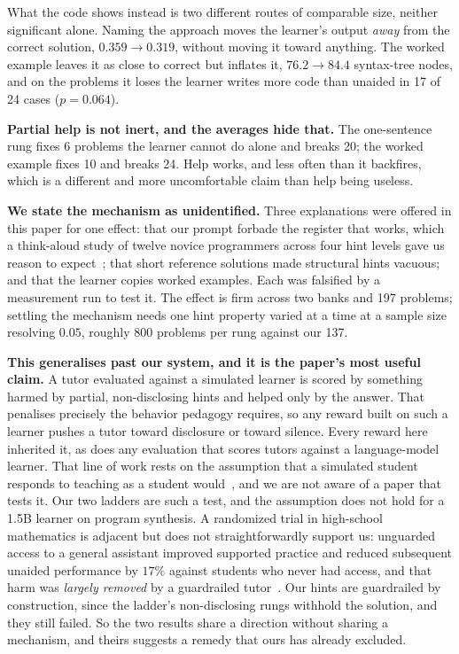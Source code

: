 \documentclass[conference]{IEEEtran}
\begin{document}
What the code shows instead is two different routes of comparable size, neither
significant alone. Naming the approach moves the learner's output \emph{away}
from the correct solution, $0.359 \rightarrow 0.319$, without moving it toward
anything. The worked example leaves it as close to correct but inflates it,
$76.2 \rightarrow 84.4$ syntax-tree nodes, and on the problems it loses the
learner writes more code than unaided in 17 of 24 cases ($p{=}0.064$).

\textbf{Partial help is not inert, and the averages hide that.} The
one-sentence rung fixes 6 problems the learner cannot do alone and breaks 20;
the worked example fixes 10 and breaks 24. Help works, and less often than it
backfires, which is a different and more uncomfortable claim than help being
useless.

\textbf{We state the mechanism as unidentified.} Three explanations were
offered in this paper for one effect: that our prompt forbade the register that
works, which a think-aloud study of twelve novice programmers across four hint
levels gave us reason to expect~\cite{hintlevels}; that short reference
solutions made structural hints vacuous; and that the learner copies worked
examples. Each was falsified by a measurement run to
test it. The effect is firm across two banks and 197 problems; settling the
mechanism needs one hint property varied at a time at a sample size resolving
$0.05$, roughly 800 problems per rung against our 137.

\textbf{This generalises past our system, and it is the paper's most useful
claim.} A tutor evaluated against a simulated learner is scored by something
harmed by partial, non-disclosing hints and helped only by the answer. That
penalises precisely the behavior pedagogy requires, so any reward built on such
a learner pushes a tutor toward disclosure or toward silence. Every reward here
inherited it, as does any evaluation that scores tutors against a
language-model learner. That line of work rests on the assumption that a
simulated student responds to teaching as a student
would~\cite{rev-simstudents}, and we are not aware of a paper that tests it.
Our two ladders are such a test, and the assumption does not hold for a 1.5B
learner on program synthesis. A randomized trial in high-school mathematics is
adjacent but does not straightforwardly support us: unguarded access to a
general assistant improved supported practice and reduced subsequent unaided
performance by $17\%$ against students who never had access, and that harm was
\emph{largely removed} by a guardrailed tutor~\cite{bastani}. Our hints are
guardrailed by construction, since the ladder's non-disclosing rungs withhold
the solution, and they still failed. So the two results share a direction
without sharing a mechanism, and theirs suggests a remedy that ours has already
excluded.
\end{document}
